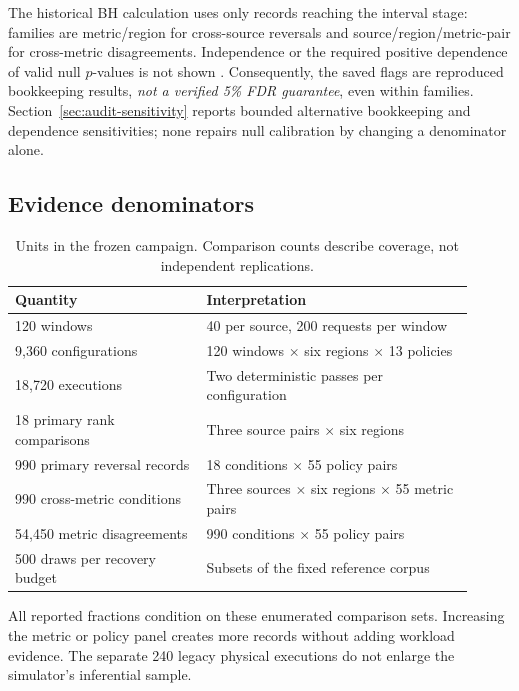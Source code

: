 The historical BH calculation uses only records reaching the interval
stage: families are metric/region for cross-source reversals and
source/region/metric-pair for cross-metric disagreements. Independence or
the required positive dependence of valid null $p$-values is not shown
\citep{benjamini2001dependency}. Consequently, the saved flags are
reproduced bookkeeping results, \emph{not a verified 5\% FDR guarantee},
even within families. Section~\ref{sec:audit-sensitivity} reports bounded
alternative bookkeeping and dependence sensitivities; none repairs null
calibration by changing a denominator alone.

\subsection{Evidence denominators}
\begin{table}[t]\centering
\caption{Units in the frozen campaign. Comparison counts describe coverage,
not independent replications.}\label{tab:denominators}
\begin{tabular}{p{0.38\linewidth}p{0.53\linewidth}}\toprule
Quantity & Interpretation\\\midrule
120 windows & 40 per source, 200 requests per window\\
9,360 configurations & 120 windows $\times$ six regions $\times$ 13 policies\\
18,720 executions & Two deterministic passes per configuration\\
18 primary rank comparisons & Three source pairs $\times$ six regions\\
990 primary reversal records & 18 conditions $\times$ 55 policy pairs\\
990 cross-metric conditions & Three sources $\times$ six regions $\times$ 55 metric pairs\\
54,450 metric disagreements & 990 conditions $\times$ 55 policy pairs\\
500 draws per recovery budget & Subsets of the fixed reference corpus\\\bottomrule
\end{tabular}
\end{table}
All reported fractions condition on these enumerated comparison sets.
Increasing the metric or policy panel creates more records without adding
workload evidence. The separate 240 legacy physical executions do not
enlarge the simulator's inferential sample.
